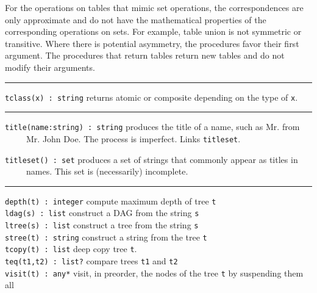 For the operations on tables that mimic set operations, the
correspondences are only approximate and do not have the mathematical
properties of the corresponding operations on sets. For example, table
{\textquotedbl}union{\textquotedbl} is not symmetric or transitive.
Where there is potential asymmetry, the procedures
{\textquotedbl}favor{\textquotedbl} their first argument. The
procedures that return tables return new tables and do not modify their
arguments.

\vspace{0.25cm}\hrule{}

\texttt{tclass(x) : string} returns {\textquotedbl}atomic{\textquotedbl}
or {\textquotedbl}composite{\textquotedbl} depending on the type of
\texttt{x}. 

\vspace{0.25cm}\hrule{}

\texttt{title(name:string) : string} produces the title of a name, such
as {\textquotedbl}Mr.{\textquotedbl} from\\
 \ \ \ \ \ {\textquotedbl}Mr. John Doe{\textquotedbl}. The process is
imperfect. Links \texttt{titleset}.

\texttt{titleset() : set} produces a set of strings that commonly appear
as titles in\\
 \ \ \ \ \ names. This set is (necessarily) incomplete. 

\vspace{0.25cm}\hrule{}

\texttt{depth(t) : integer} compute maximum depth of tree
\texttt{t}\\
\texttt{ldag(s) : list} construct a DAG from the string
\texttt{s}\\
\texttt{ltree(s) : list} construct a tree from the string
\texttt{s}\\
\texttt{stree(t) : string} construct a string from the tree
\texttt{t}\\
\texttt{tcopy(t) : list} deep copy tree \texttt{t}.\\
\texttt{teq(t1,t2) : list?} compare trees \texttt{t1} and
\texttt{t2}\\
\texttt{visit(t) : any*} visit, in preorder, the nodes of the tree
\texttt{t} by suspending them all 

